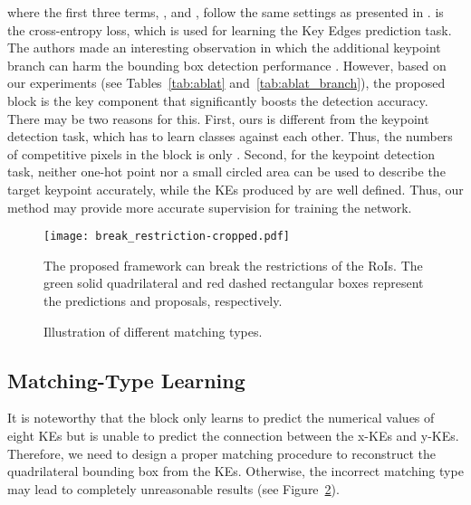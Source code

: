 \noindent where the first three terms, ,  and , follow the same settings as presented in \cite{he2017mask}.
 is the cross-entropy loss, which is used for learning the Key Edges prediction task.
The authors made an interesting observation in which the additional keypoint branch can
harm the bounding box detection performance \cite{he2017mask}. However, based on our experiments (see Tables~\ref{tab:ablat} and~\ref{tab:ablat_branch}), the proposed \Ours block is the key component that significantly boosts 
the
detection accuracy. There may be two reasons for this. First, ours is different 
from the keypoint detection task, which has to learn  classes against each other. Thus, the numbers of competitive pixels in the \Ours block is only . Second, for the keypoint detection task, neither one-hot point nor a small circled area can be used to describe the target keypoint accurately, while the KEs produced by \Ours are 
well defined. 
Thus, our method may provide more accurate supervision for training the network.



\begin{figure}[t!]
	\centering
	\texttt{[image: break\_restriction-cropped.pdf]}
	\caption{The proposed framework can break the restrictions of the RoIs. The green solid quadrilateral and red dashed rectangular boxes represent the predictions and proposals, respectively.}
	\label{fig:break_restriction}
\end{figure}

\begin{figure}[b!]
	\centering
	\hspace{0.05cm}
	\caption{Illustration of different matching types.}
	\label{fig:match_types}
\end{figure}



\subsection{Matching-Type Learning}

It is noteworthy that the \Ours block only learns to predict the numerical values of eight KEs but is unable to predict the connection between the x-KEs and y-KEs. Therefore, we need to design a proper matching procedure to reconstruct the quadrilateral bounding box from the KEs. Otherwise, the incorrect matching type may lead to completely unreasonable results (see Figure~\ref{fig:match_types}).

